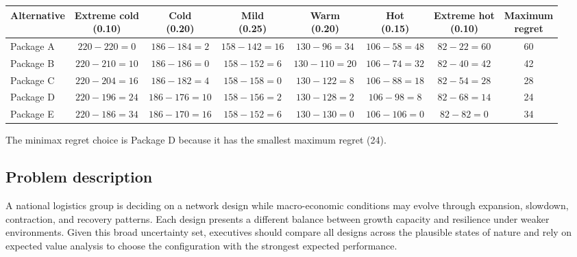 \begin{ExamProblems}
		\hspace*{-1.5cm}%
		\begin{tabular}{l c c c c c c c}
			\toprule
			Alternative 
			& \shortstack{Extreme cold\\(0.10)} 
			& \shortstack{Cold\\(0.20)} 
			& \shortstack{Mild\\(0.25)} 
			& \shortstack{Warm\\(0.20)} 
			& \shortstack{Hot\\(0.15)} 
			& \shortstack{Extreme hot\\(0.10)} 
			& \shortstack{Maximum\\regret} \\
			\midrule
			Package A & $220-220=0$ & $186-184=2$ & $158-142=16$ & $130-96=34$ & $106-58=48$ & $82-22=60$ & 60 \\
			Package B & $220-210=10$ & $186-186=0$ & $158-152=6$ & $130-110=20$ & $106-74=32$ & $82-40=42$ & 42 \\
			Package C & $220-204=16$ & $186-182=4$ & $158-158=0$ & $130-122=8$ & $106-88=18$ & $82-54=28$ & 28 \\
			Package D & $220-196=24$ & $186-176=10$ & $158-156=2$ & $130-128=2$ & $106-98=8$ & $82-68=14$ & 24 \\
			Package E & $220-186=34$ & $186-170=16$ & $158-152=6$ & $130-130=0$ & $106-106=0$ & $82-82=0$ & 34 \\
			\bottomrule
		\end{tabular}
	The minimax regret choice is Package D because it has the smallest maximum regret (24).
		\item
		\subsection*{Problem description}
		A national logistics group is deciding on a network design while macro-economic conditions may evolve through expansion, slowdown, contraction, and recovery patterns. Each design presents a different balance between growth capacity and resilience under weaker environments. Given this broad uncertainty set, executives should compare all designs across the plausible states of nature and rely on expected value analysis to choose the configuration with the strongest expected performance.


\end{ExamProblems}
